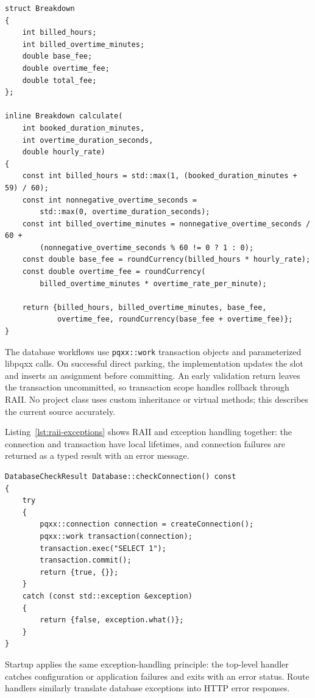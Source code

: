\documentclass[12pt,a4paper]{article}
\begin{document}
\begin{lstlisting}[caption={Implemented fee calculation in parking\_fees.h.},label={lst:fees}]
struct Breakdown
{
    int billed_hours;
    int billed_overtime_minutes;
    double base_fee;
    double overtime_fee;
    double total_fee;
};

inline Breakdown calculate(
    int booked_duration_minutes,
    int overtime_duration_seconds,
    double hourly_rate)
{
    const int billed_hours = std::max(1, (booked_duration_minutes + 59) / 60);
    const int nonnegative_overtime_seconds =
        std::max(0, overtime_duration_seconds);
    const int billed_overtime_minutes = nonnegative_overtime_seconds / 60 +
        (nonnegative_overtime_seconds % 60 != 0 ? 1 : 0);
    const double base_fee = roundCurrency(billed_hours * hourly_rate);
    const double overtime_fee = roundCurrency(
        billed_overtime_minutes * overtime_rate_per_minute);

    return {billed_hours, billed_overtime_minutes, base_fee,
            overtime_fee, roundCurrency(base_fee + overtime_fee)};
}
\end{lstlisting}

The database workflows use \texttt{pqxx::work} transaction objects and
parameterized libpqxx calls. On successful direct parking, the implementation
updates the slot and inserts an assignment before committing.
An early validation return leaves the transaction uncommitted, so transaction
scope handles rollback through RAII. No project class uses custom inheritance
or virtual methods; this describes the current source accurately.

Listing~\ref{lst:raii-exceptions} shows RAII and exception handling together:
the connection and transaction have local lifetimes, and connection failures
are returned as a typed result with an error message.

\begin{lstlisting}[caption={Scoped libpqxx resources and exception handling in the database health check.},label={lst:raii-exceptions}]
DatabaseCheckResult Database::checkConnection() const
{
    try
    {
        pqxx::connection connection = createConnection();
        pqxx::work transaction(connection);
        transaction.exec("SELECT 1");
        transaction.commit();
        return {true, {}};
    }
    catch (const std::exception &exception)
    {
        return {false, exception.what()};
    }
}
\end{lstlisting}

Startup applies the same exception-handling principle: the top-level handler
catches configuration or application failures and exits with an error status.
Route handlers similarly translate database exceptions into HTTP error
responses.
\end{document}
